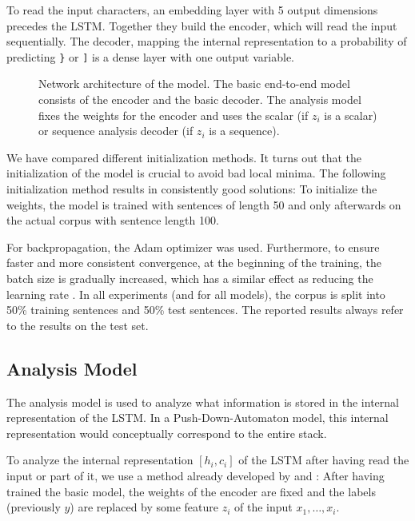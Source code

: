 \documentclass[11pt,a4paper]{article}
\begin{document}

To read the input characters, an embedding layer with 5 output dimensions precedes the LSTM. Together they build the encoder, which will read the input sequentially. The decoder, mapping the internal representation to a probability of predicting \verb|}| or \verb|]| is a dense layer with one output variable.

\begin{figure*}[ht]
    \centering
    
    \caption{Network architecture of the model. The basic end-to-end model consists of the encoder and the basic decoder. The analysis model fixes the weights for the encoder and uses the scalar (if $z_i$ is a scalar) or sequence analysis decoder (if $z_i$ is a sequence).}
    \label{fig:lstm_architecture}
\end{figure*}

We have compared different initialization methods. It turns out that the initialization of the model is crucial to avoid bad local minima. The following initialization method results in consistently good solutions: To initialize the weights, the model is trained with sentences of length 50 and only afterwards on the actual corpus with sentence length 100.

For backpropagation, the Adam \cite{kingma2014adam} optimizer was used. Furthermore, to ensure faster and more consistent convergence, at the beginning of the training, the batch size is gradually increased, which has a similar effect as reducing the learning rate \cite{smith2017don}. In all experiments (and for all models), the corpus is split into 50\% training sentences and 50\% test sentences. The reported results always refer to the results on the test set.

\subsection{Analysis Model}

The analysis model is used to analyze what information is stored in the internal representation of the LSTM. In a Push-Down-Automaton model, this internal representation would conceptually correspond to the entire stack.

To analyze the internal representation $[h_i, c_i]$ of the LSTM after having read the input or part of it, we use a method already developed by \citeauthor{shi2016does}  and \citeauthor{belinkov2017neural} : After having trained the basic model, the weights of the encoder are fixed and the labels (previously $y$) are replaced by some feature $z_i$ of the input $x_1,\ldots, x_i$.
\end{document}
